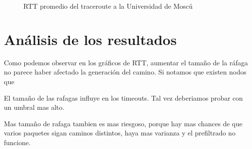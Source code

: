 \begin{figure}[H]
  \centering
  \caption{RTT promedio del traceroute a la Universidad de Moscú}
  \label{rusiaTTL}
\end{figure}


\section{Análisis de los resultados}

Como podemos observar en los gráficos de RTT, aumentar el tamaño de la ráfaga no parece haber afectado la generación del camino. Si notamos que existen nodos que 


El tamaño de las rafagas influye en los timeouts. Tal vez deberiamos probar con un umbral mas alto.

Mas tamaño de rafaga tambien es mas riesgoso, porque hay mas chances de que varios paquetes sigan caminos distintos, haya mas varianza y el prefiltrado no funcione.

